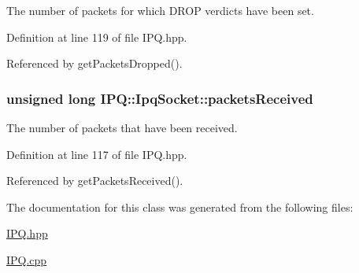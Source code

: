 \-The number of packets for which \-D\-R\-O\-P verdicts have been set. 



\-Definition at line 119 of file \-I\-P\-Q.\-hpp.



\-Referenced by get\-Packets\-Dropped().

\hypertarget{classIPQ_1_1IpqSocket_a85d2411c577e4bec30b15d3ec43a21f0}{
\subsubsection[{packets\-Received}]{\setlength{\rightskip}{0pt plus 5cm}unsigned long {\bf \-I\-P\-Q\-::\-Ipq\-Socket\-::packets\-Received}}}
\label{classIPQ_1_1IpqSocket_a85d2411c577e4bec30b15d3ec43a21f0}


\-The number of packets that have been received. 



\-Definition at line 117 of file \-I\-P\-Q.\-hpp.



\-Referenced by get\-Packets\-Received().



\-The documentation for this class was generated from the following files\-:\begin{DoxyCompactItemize}
\item 
\hyperlink{IPQ_8hpp}{\-I\-P\-Q.\-hpp}\item 
\hyperlink{IPQ_8cpp}{\-I\-P\-Q.\-cpp}\end{DoxyCompactItemize}

